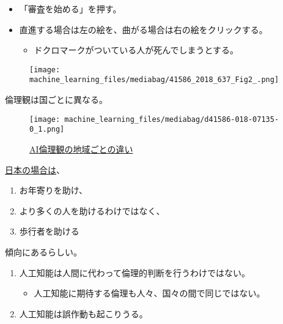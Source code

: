 \documentclass[
  xelatex,
  ja=standard]{bxjsarticle}
\providecommand{\tightlist}{%
  \setlength{\itemsep}{0pt}\setlength{\parskip}{0pt}}\usepackage{longtable,booktabs,array}
\begin{document}
\begin{itemize}
\tightlist
\item
  「審査を始める」を押す。
\item
  直進する場合は左の絵を、曲がる場合は右の絵をクリックする。

  \begin{itemize}
  \tightlist
  \item
    ドクロマークがついている人が死んでしまうとする。
  \end{itemize}
\end{itemize}

\begin{figure}[htpb]

{\centering \texttt{[image: machine\_learning\_files/mediabag/41586\_2018\_637\_Fig2\_.png]}

}

\caption{\citet{awad2018}}

\end{figure}

倫理観は国ごとに異なる。

\begin{figure}[htpb]

{\centering \texttt{[image: machine\_learning\_files/mediabag/d41586-018-07135-0\_1.png]}

}

\caption{\href{https://www.nature.com/articles/d41586-018-07135-0}{AI倫理観の地域ごとの違い}}

\end{figure}

\href{https://www.technologyreview.com/2018/10/24/139313/a-global-ethics-study-aims-to-help-ai-solve-the-self-driving-trolley-problem/}{日本の場合は}、

\begin{enumerate}
\def\labelenumi{\arabic{enumi}.}
\tightlist
\item
  お年寄りを助け、
\item
  より多くの人を助けるわけではなく、
\item
  歩行者を助ける
\end{enumerate}

傾向にあるらしい。

\begin{enumerate}
\def\labelenumi{\arabic{enumi}.}
\tightlist
\item
  人工知能は人間に代わって倫理的判断を行うわけではない。

  \begin{itemize}
  \tightlist
  \item
    人工知能に期待する倫理も人々、国々の間で同じではない。
  \end{itemize}
\item
  人工知能は誤作動も起こりうる。
\end{enumerate}
\end{document}
